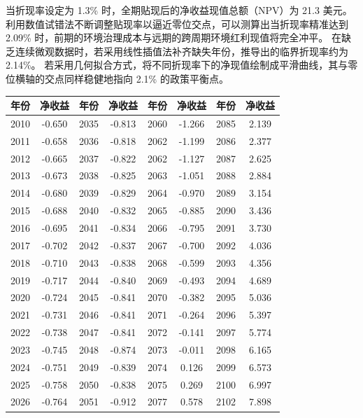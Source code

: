 \begin{enumerate}[label=\textbf{\arabic*.}, leftmargin=*]
		当折现率设定为 1.3\% 时，全期贴现后的净收益现值总额（NPV）为 21.3 美元。
		利用数值试错法不断调整贴现率以逼近零位交点，可以测算出当折现率精准达到 2.09\% 时，前期的环境治理成本与远期的跨周期环境红利现值将完全冲平。
		在缺乏连续微观数据时，若采用线性插值法补齐缺失年份，推导出的临界折现率约为 2.14\%。
		若采用几何拟合方式，将不同折现率下的净现值绘制成平滑曲线，其与零位横轴的交点同样稳健地指向 2.1\% 的政策平衡点。
		
		\begin{center}
			\footnotesize
			\renewcommand{\arraystretch}{1.2}
			\begin{tabular*}{\linewidth}{@{\extracolsep{\fill}}cccccccc}
				\hline
				年份 & 净收益 & 年份 & 净收益 & 年份 & 净收益 & 年份 & 净收益 \\ \hline
				2010 & -0.650 & 2035 & -0.813 & 2060 & -1.266 & 2085 & 2.139  \\
				2011 & -0.658 & 2036 & -0.818 & 2062 & -1.199 & 2086 & 2.377  \\
				2012 & -0.665 & 2037 & -0.822 & 2062 & -1.127 & 2087 & 2.625  \\
				2013 & -0.673 & 2038 & -0.825 & 2063 & -1.051 & 2088 & 2.884  \\
				2014 & -0.680 & 2039 & -0.829 & 2064 & -0.970 & 2089 & 3.154  \\
				2015 & -0.688 & 2040 & -0.832 & 2065 & -0.885 & 2090 & 3.436  \\
				2016 & -0.695 & 2041 & -0.834 & 2066 & -0.795 & 2091 & 3.730  \\
				2017 & -0.702 & 2042 & -0.837 & 2067 & -0.700 & 2092 & 4.036  \\
				2018 & -0.710 & 2043 & -0.838 & 2068 & -0.599 & 2093 & 4.356  \\
				2019 & -0.717 & 2044 & -0.840 & 2069 & -0.493 & 2094 & 4.689  \\
				2020 & -0.724 & 2045 & -0.841 & 2070 & -0.382 & 2095 & 5.036  \\
				2021 & -0.731 & 2046 & -0.841 & 2071 & -0.264 & 2096 & 5.397  \\
				2022 & -0.738 & 2047 & -0.841 & 2072 & -0.141 & 2097 & 5.774  \\
				2023 & -0.745 & 2048 & -0.874 & 2073 & -0.011 & 2098 & 6.165  \\
				2024 & -0.751 & 2049 & -0.839 & 2074 & 0.126  & 2099 & 6.573  \\
				2025 & -0.758 & 2050 & -0.838 & 2075 & 0.269  & 2100 & 6.997  \\ \hline
				2026 & -0.764 & 2051 & -0.912 & 2077 & 0.578  & 2102 & 7.898  \\

\end{tabular*}
\end{center}
\end{enumerate}
